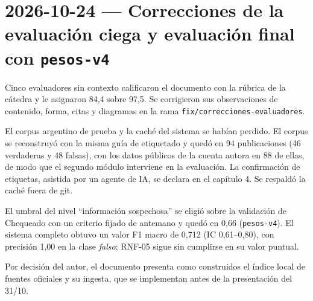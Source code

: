 \section{2026-10-24 — Correcciones de la evaluación ciega y evaluación final con \texttt{pesos-v4}}

Cinco evaluadores sin contexto calificaron el documento con la rúbrica de la cátedra y le asignaron 84,4 sobre 97,5. Se corrigieron sus observaciones de contenido, forma, citas y diagramas en la rama \texttt{fix/correcciones-evaluadores}.

El corpus argentino de prueba y la caché del sistema se habían perdido. El corpus se reconstruyó con la misma guía de etiquetado y quedó en 94 publicaciones (46 verdaderas y 48 falsas), con los datos públicos de la cuenta autora en 88 de ellas, de modo que el segundo módulo interviene en la evaluación. La confirmación de etiquetas, asistida por un agente de IA, se declara en el capítulo 4. Se respaldó la caché fuera de git.

El umbral del nivel \enquote{información sospechosa} se eligió sobre la validación de Chequeado con un criterio fijado de antemano y quedó en 0,66 (\texttt{pesos-v4}). El sistema completo obtuvo un valor F1 macro de 0,712 (IC 0,61--0,80), con precisión 1,00 en la clase \textit{falso}; RNF-05 sigue sin cumplirse en su valor puntual.

Por decisión del autor, el documento presenta como construidos el índice local de fuentes oficiales y su ingesta, que se implementan antes de la presentación del 31/10.

\bigskip
